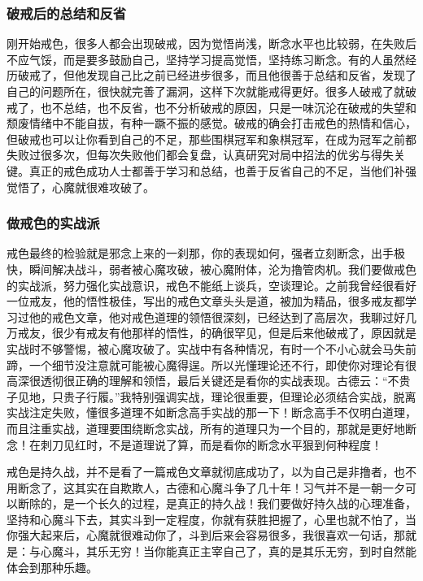 \subsubsection{破戒后的总结和反省}

刚开始戒色，很多人都会出现破戒，因为觉悟尚浅，断念水平也比较弱，在失败后不应气馁，而是要多鼓励自己，坚持学习提高觉悟，坚持练习断念。有的人虽然经历破戒了，但他发现自己比之前已经进步很多，而且他很善于总结和反省，发现了自己的问题所在，很快就完善了漏洞，这样下次就能戒得更好。很多人破戒了就破戒了，也不总结，也不反省，也不分析破戒的原因，只是一味沉沦在破戒的失望和颓废情绪中不能自拔，有种一蹶不振的感觉。破戒的确会打击戒色的热情和信心，但破戒也可以让你看到自己的不足，那些围棋冠军和象棋冠军，在成为冠军之前都失败过很多次，但每次失败他们都会复盘，认真研究对局中招法的优劣与得失关键。真正的戒色成功人士都善于学习和总结，也善于反省自己的不足，当他们补强觉悟了，心魔就很难攻破了。

\subsubsection{做戒色的实战派}

戒色最终的检验就是邪念上来的一刹那，你的表现如何，强者立刻断念，出手极快，瞬间解决战斗，弱者被心魔攻破，被心魔附体，沦为撸管肉机。我们要做戒色的实战派，努力强化实战意识，戒色不能纸上谈兵，空谈理论。之前我曾经很看好一位戒友，他的悟性极佳，写出的戒色文章头头是道，被加为精品，很多戒友都学习过他的戒色文章，他对戒色道理的领悟很深刻，已经达到了高层次，我聊过好几万戒友，很少有戒友有他那样的悟性，的确很罕见，但是后来他破戒了，原因就是实战时不够警惕，被心魔攻破了。实战中有各种情况，有时一个不小心就会马失前蹄，一个细节没注意就可能被心魔得逞。所以光懂理论还不行，即使你对理论有很高深很透彻很正确的理解和领悟，最后关键还是看你的实战表现。古德云：“不贵子见地，只贵子行履。”我特别强调实战，理论很重要，但理论必须结合实战，脱离实战注定失败，懂很多道理不如断念高手实战的那一下！断念高手不仅明白道理，而且注重实战，道理要围绕断念实战，所有的道理只为一个目的，那就是更好地断念！在刺刀见红时，不是道理说了算，而是看你的断念水平狠到何种程度！

戒色是持久战，并不是看了一篇戒色文章就彻底成功了，以为自己是非撸者，也不用断念了，这其实在自欺欺人，古德和心魔斗争了几十年！习气并不是一朝一夕可以断除的，是一个长久的过程，是真正的持久战！我们要做好持久战的心理准备，坚持和心魔斗下去，其实斗到一定程度，你就有获胜把握了，心里也就不怕了，当你强大起来后，心魔就很难动你了，斗到后来会容易很多，我很喜欢一句话，那就是：与心魔斗，其乐无穷！当你能真正主宰自己了，真的是其乐无穷，到时自然能体会到那种乐趣。

